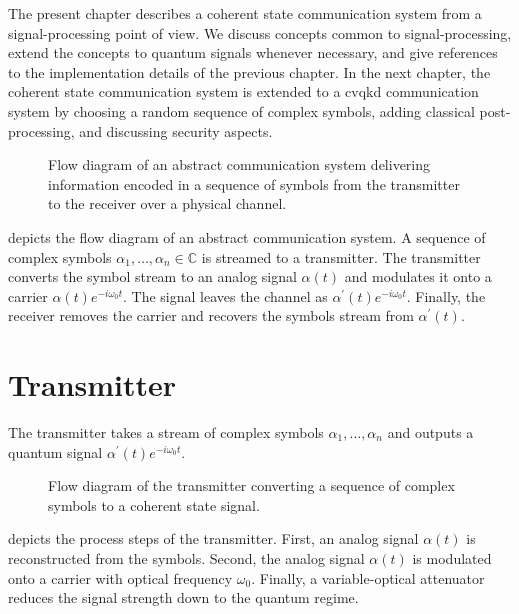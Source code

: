 The present chapter describes a coherent state communication system from a signal-processing point of view.
We discuss concepts common to signal-processing, extend the concepts to quantum signals whenever necessary, and give references to the implementation details of the previous chapter.
In the next chapter, the coherent state communication system is extended to a \gls{cvqkd} communication system by choosing a random sequence of complex symbols, adding classical post-processing, and discussing security aspects.

\begin{figure}[htb]
	\centering
	
	\caption{Flow diagram of an abstract communication system delivering information encoded in a sequence of symbols from the transmitter to the receiver over a physical channel.}\label{fig:communication_system}
\end{figure}
 depicts the flow diagram of an abstract communication system.
A sequence of complex symbols $\alpha_1,\dots,\alpha_n\in\mathbb{C}$ is streamed to a transmitter.
The transmitter converts the symbol stream to an analog signal $\alpha(t)$ and modulates it onto a carrier $\alpha(t)e^{-i\omega_0t}$.
The signal leaves the channel as $\alpha^\prime(t)e^{-i\omega_0t}$.
Finally, the receiver removes the carrier and recovers the symbols stream from $\alpha^\prime(t)$.

\section{Transmitter}

The transmitter takes a stream of complex symbols $\alpha_1,\dots,\alpha_n$ and outputs a quantum signal $\alpha^\prime(t)e^{-i\omega_0t}$.

\begin{figure}[htb]
	\centering
	
	\caption{Flow diagram of the transmitter converting a sequence of complex symbols to a coherent state signal.}\label{fig:transmitter}
\end{figure}
 depicts the process steps of the transmitter.
First, an analog signal $\alpha(t)$ is reconstructed from the symbols.
Second, the analog signal $\alpha(t)$ is modulated onto a carrier with optical frequency $\omega_0$.
Finally, a variable-optical attenuator reduces the signal strength down to the quantum regime.

